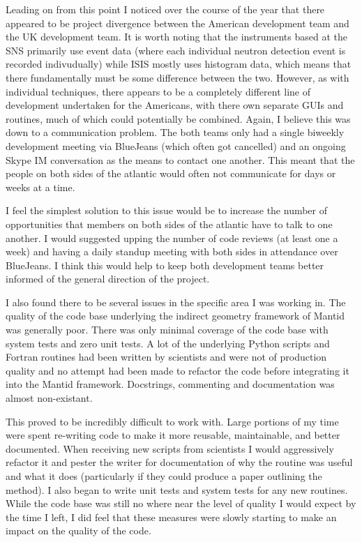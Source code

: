 \documentclass[paper=a4, fontsize=11pt]{scrartcl}	%
\numberwithin{equation}{section}															%
\numberwithin{figure}{section}																%
\numberwithin{table}{section}
\begin{document}
Leading on from this point I noticed over the course of the year that
there appeared to be project divergence between the American development
team and the UK development team. It is worth noting that the
instruments based at the SNS primarily use event data (where each
individual neutron detection event is recorded indivudually) while ISIS
mostly uses histogram data, which means that there fundamentally must be
some difference between the two. However, as with individual techniques,
there appears to be a completely different line of development
undertaken for the Americans, with there own separate GUIs and routines,
much of which could potentially be combined. Again, I believe this was
down to a communication problem. The both teams only had a single
biweekly development meeting via BlueJeans (which often got cancelled)
and an ongoing Skype IM conversation as the means to contact one
another. This meant that the people on both sides of the atlantic would
often not communicate for days or weeks at a time.

I feel the simplest solution to this issue would be to increase the
number of opportunities that members on both sides of the atlantic have
to talk to one another. I would suggested upping the number of code
reviews (at least one a week) and having a daily standup meeting with
both sides in attendance over BlueJeans. I think this would help to keep
both development teams better informed of the general direction of the
project.

I also found there to be several issues in the specific area I was
working in. The quality of the code base underlying the indirect
geometry framework of Mantid was generally poor. There was only minimal
coverage of the code base with system tests and zero unit tests. A lot
of the underlying Python scripts and Fortran routines had been written
by scientists and were not of production quality and no attempt had been
made to refactor the code before integrating it into the Mantid
framework. Docstrings, commenting and documentation was almost
non-existant.

This proved to be incredibly difficult to work with. Large portions of
my time were spent re-writing code to make it more reusable,
maintainable, and better documented. When receiving new scripts from
scientists I would aggressively refactor it and pester the writer for
documentation of why the routine was useful and what it does
(particularly if they could produce a paper outlining the method). I
also began to write unit tests and system tests for any new routines.
While the code base was still no where near the level of quality I would
expect by the time I left, I did feel that these measures were slowly
starting to make an impact on the quality of the code.
\end{document}
